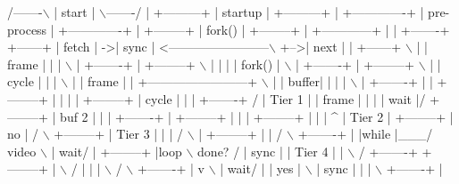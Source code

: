 \begin{DoxyCode}
                    /-------\(\backslash\)
                    | start |
                    \(\backslash\)-------/
                        |
                   +---------+
                   | startup |
                   +---------+
                        |
                 +-------------+
                 | pre-process |
                 +-------------+
                        |
                   +--------+
                   | fork() |
                   +--------+
                        |
           +------------+
           |            |
       +-------+    +------+
       | fetch |  ->| sync | <------------------------\(\backslash\)
   +-->| next  |  | +------+                           \(\backslash\)
   |   | frame |  |     |                               \(\backslash\)
   |   +-------+  | +--------+                           \(\backslash\)
   |       |      | | fork() |                            \(\backslash\)
   |   +-------+  | +--------+                             \(\backslash\)
   |   | cycle |  |         |                               \(\backslash\)
   |   | frame |  |         +------------------------+       \(\backslash\)
   |   | buffer|  |         |                        |        \(\backslash\)
   |   +-------+  |         |                   +--------+    |
   |       |      |    +--------+               | cycle  |    |
   |   +-------+ /     | Tier 1 |               | frame  |    |
   |   |  wait |/      +--------+               | buf 2  |    |
   |   +-------+            |                   +--------+    |
   |       |           +--------+                    |        |
   |       ^           | Tier 2 |               +--------+    |
no |      / \(\backslash\)          +--------+               | Tier 3 |    |
   |     /   \(\backslash\)              |                   +--------+    |
   |    /     \(\backslash\)         +-------+                    |        |while
   |\_\_\_/ video \(\backslash\)        | wait/ |               +--------+    |loop
       \(\backslash\) done? /        |  sync |               | Tier 4 |    |
        \(\backslash\)     /         +-------+               +--------+    |
         \(\backslash\)   /              |                        |        |
          \(\backslash\) /               \(\backslash\)                    +-------+    |
           v                 \(\backslash\)                   | wait/ |    |
       yes |                  \(\backslash\)                  |  sync |    |
           |                   \(\backslash\)                 +-------+    |

\end{DoxyCode}
